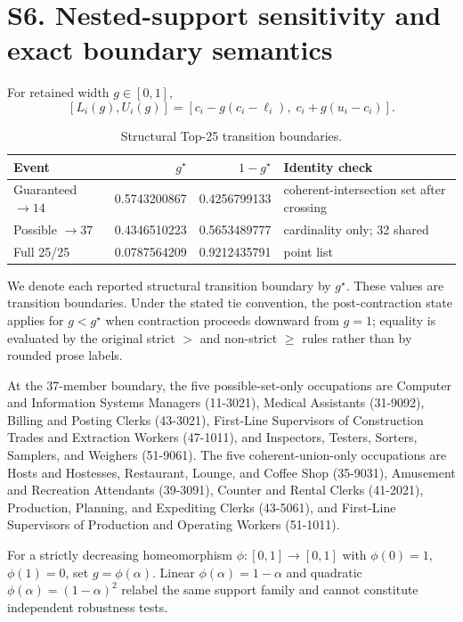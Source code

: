 \documentclass[10pt]{article}
\begin{document}
\section*{S6. Nested-support sensitivity and exact boundary semantics}
For retained width $g\in[0,1]$,
\[[L_i(g),U_i(g)]=[c_i-g(c_i-\ell_i),\;c_i+g(u_i-c_i)].\]
\begin{table}[h]\centering\small
\caption{Structural Top-25 transition boundaries.}
\begin{tabular}{lrrp{}}\toprule Event&$g^\star$&$1-g^\star$&Identity check\\\midrule
Guaranteed $\to14$&0.5743200867&0.4256799133&coherent-intersection set after crossing\\
Possible $\to37$&0.4346510223&0.5653489777&cardinality only; 32 shared\\
Full 25/25&0.0787564209&0.9212435791&point list\\\bottomrule\end{tabular}
\end{table}
We denote each reported structural transition boundary by $g^\star$. These values are transition boundaries. Under the stated tie convention, the post-contraction state applies for $g<g^\star$ when contraction proceeds downward from $g=1$; equality is evaluated by the original strict $>$ and non-strict $\ge$ rules rather than by rounded prose labels.

At the 37-member boundary, the five possible-set-only occupations are Computer and Information Systems Managers (11-3021), Medical Assistants (31-9092), Billing and Posting Clerks (43-3021), First-Line Supervisors of Construction Trades and Extraction Workers (47-1011), and Inspectors, Testers, Sorters, Samplers, and Weighers (51-9061). The five coherent-union-only occupations are Hosts and Hostesses, Restaurant, Lounge, and Coffee Shop (35-9031), Amusement and Recreation Attendants (39-3091), Counter and Rental Clerks (41-2021), Production, Planning, and Expediting Clerks (43-5061), and First-Line Supervisors of Production and Operating Workers (51-1011).

For a strictly decreasing homeomorphism $\phi:[0,1]\to[0,1]$ with $\phi(0)=1$, $\phi(1)=0$, set $g=\phi(\alpha)$. Linear $\phi(\alpha)=1-\alpha$ and quadratic $\phi(\alpha)=(1-\alpha)^2$ relabel the same support family and cannot constitute independent robustness tests.
\end{document}
